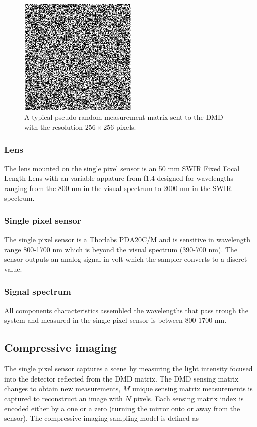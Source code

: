 \begin{figure}[H]
    \centering
    \includegraphics[width = 0.5\textwidth]{gfx/DMD_pattern.png}
    \caption{A typical pseudo random measurement matrix sent to the DMD with the resolution $256 \times 256$ pixels.}
    \label{fig:dmd_pattern}
\end{figure}



\subsubsection{Lens}
The lens mounted on the single pixel sensor is an 50 mm SWIR Fixed Focal Length Lens with an variable appature from f1.4 designed for wavelengths ranging from the 800 nm in the visual spectrum to 2000 nm in the SWIR spectrum. \cite{website:SWIR_objective}

\subsubsection{Single pixel sensor}
The single pixel sensor is a Thorlabs PDA20C/M and is sensitive in wavelength range 800-1700 nm which is beyond the visual spectrum (390-700 nm). The sensor outputs an analog signal in volt which the sampler converts to a discret value. \cite{manual:PDA}

\subsubsection{Signal spectrum}
All components characteristics assembled the wavelengths that pass trough the system and measured in the single pixel sensor is between 800-1700 nm.



\subsection{Compressive imaging}
The single pixel sensor captures a scene by measuring the light intensity focused into the detector reflected from the DMD matrix. The DMD sensing matrix changes to obtain new measurements, $M$ unique sensing matrix measurements is captured to reconstruct an image with $N$ pixels. Each sensing matrix index is encoded either  by a one or a zero (turning the mirror onto or away from the sensor). The compressive imaging sampling model is defined as

